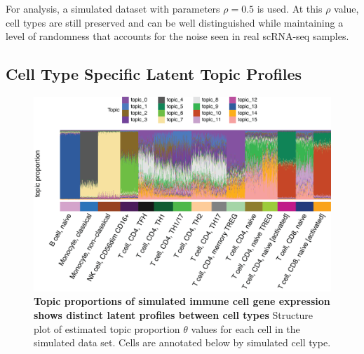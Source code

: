 For analysis, a simulated dataset with parameters $\rho = 0.5$ is used. At this $\rho$ value, cell types are still preserved and can be well distinguished while maintaining a level of randomness that accounts for the noise seen in real scRNA-seq samples. 




\subsection{Cell Type Specific Latent Topic Profiles}

\begin{figure}
    \centering
    \includegraphics[width=\textwidth]{Figures/structure_plot.png}
    \caption{\textbf{Topic proportions of simulated immune cell gene expression shows distinct latent profiles between cell types} Structure plot of estimated topic proportion $\theta$ values for each cell in the simulated data set. Cells are annotated below by simulated cell type.}
    \label{fig:struct_plt}
\end{figure}

